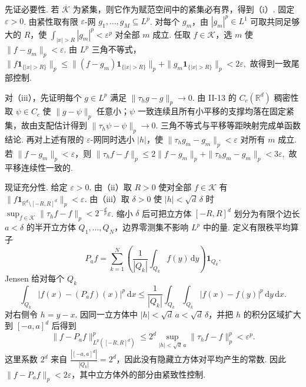 \begin{FAProof}
先证必要性. 若 \(\displaystyle\overline{\mathcal K}\) 为紧集，则它作为赋范空间中的紧集必有界，得到（i）. 固定 \(\displaystyle\varepsilon>0\). 由紧性取有限 \(\displaystyle\varepsilon\)-网 \(\displaystyle g_1,\dots,g_M\subseteq L^p\). 对每个 \(\displaystyle g_m\)，由 \(\displaystyle|g_m|^p\in L^1\) 可取共同足够大的 \(\displaystyle R\)，使 \(\displaystyle\int_{|x|>R}|g_m|^p<\varepsilon^p\) 对全部 \(\displaystyle m\) 成立. 任取 \(\displaystyle f\in\mathcal K\)，选 \(\displaystyle m\) 使 \(\displaystyle\|f-g_m\|_p<\varepsilon\). 由 \(\displaystyle L^p\) 三角不等式， \(\displaystyle \|f\mathbf1_{\{|x|>R\}}\|_p \leqslant \|(f-g_m)\mathbf1_{\{|x|>R\}}\|_p + \|g_m\mathbf1_{\{|x|>R\}}\|_p <2\varepsilon,\)
故得到一致尾部控制.

对（iii），先证明每个 \(\displaystyle g\in L^p\) 满足 \(\displaystyle\|\tau_hg-g\|_p\to0\). 由 II-13 的 \(\displaystyle C_c(\mathbb R^d)\) 稠密性取 \(\displaystyle\psi\in C_c\) 使 \(\displaystyle\|g-\psi\|_p\) 任意小；\(\displaystyle\psi\) 一致连续且所有小平移的支撑均落在固定紧集，故由支配估计得到 \(\displaystyle\|\tau_h\psi-\psi\|_p\to0\). 三角不等式与平移等距映射完成单函数结论. 再对上述有限的 \(\displaystyle\varepsilon\)-网同时选小 \(\displaystyle|h|\)，使 \(\displaystyle\|\tau_hg_m-g_m\|_p<\varepsilon\) 对所有 \(\displaystyle m\) 成立. 若 \(\displaystyle\|f-g_m\|_p<\varepsilon\)，则 \(\displaystyle \|\tau_hf-f\|_p \leqslant 2\|f-g_m\|_p+ \|\tau_hg_m-g_m\|_p <3\varepsilon,\)
故平移连续性一致的.

现证充分性. 给定 \(\displaystyle\varepsilon>0\). 由（ii）取 \(\displaystyle R>0\) 使对全部 \(\displaystyle f\in\mathcal K\) 有 \(\displaystyle\|f\mathbf1_{\mathbb R^d\setminus[-R,R]^d}\|_p<\varepsilon\). 由（iii）取 \(\displaystyle\delta>0\) 使 \(\displaystyle|h|<\sqrt d\,\delta\) 时 \(\displaystyle\sup_{f\in\mathcal K}\|\tau_hf-f\|_p<2^{-\frac{d}{p}}\varepsilon\). 缩小 \(\displaystyle\delta\) 后可把立方体 \(\displaystyle[-R,R]^d\) 划分为有限个边长 \(\displaystyle a<\delta\) 的半开立方体 \(\displaystyle Q_1,\dots,Q_N\)，边界零测集不影响 \(\displaystyle L^p\) 中的量. 定义有限秩平均算子
\[
P_af
=
\sum_{k=1}^N
\left(\frac1{|Q_k|}\int_{Q_k}f(y)\,\mathrm{d}y\right)
\mathbf1_{Q_k}.
\]
Jensen 给对每个 \(\displaystyle Q_k\)
\[
\int_{Q_k}|f(x)-(P_af)(x)|^p\,\mathrm{d}x
\leqslant
\frac1{|Q_k|}
\int_{Q_k}\int_{Q_k}|f(x)-f(y)|^p\,\mathrm{d}y\,\mathrm{d}x.
\]
对右侧令 \(\displaystyle h=y-x\). 因同一立方体中 \(\displaystyle|h|<\sqrt d\,a<\sqrt d\,\delta\)，并把 \(\displaystyle h\) 的积分区域扩大到 \(\displaystyle[-a,a]^d\) 后得到
\[
\|f-P_af\|_{L^p([-R,R]^d)}^p
\leqslant
2^d
\sup_{|h|<\sqrt d\,a}
\|\tau_hf-f\|_p^p
<
\varepsilon^p.
\]
这里系数 \(\displaystyle2^d\) 来自 \(\displaystyle\frac{|[-a,a]^d|}{|Q_k|}=2^d\)，因此没有隐藏立方体对平均产生的常数.
因此 \(\displaystyle\|f-P_af\|_p<2\varepsilon\)，其中立方体外的部分由紧致性控制.


\end{FAProof}
